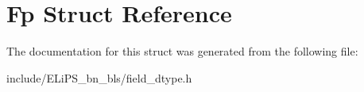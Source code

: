 \hypertarget{struct_fp}{}\section{Fp Struct Reference}
\label{struct_fp}


The documentation for this struct was generated from the following file\+:\begin{DoxyCompactItemize}
\item 
include/\+E\+Li\+P\+S\+\_\+bn\+\_\+bls/field\+\_\+dtype.\+h\end{DoxyCompactItemize}
